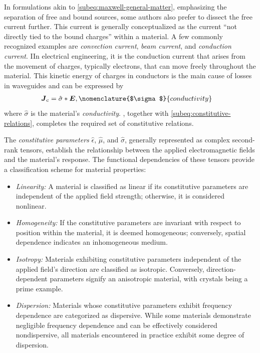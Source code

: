 \documentclass[11pt,a4paper,twoside,openany]{report}
\begin{document}
\begin{remark}
    In formulations akin to \cref{subeq:maxwell-general-matter}, emphasizing the separation of free and bound sources, some authors also prefer to dissect the free current further. This current is generally conceptualized as the current \enquote{not directly tied to the bound charges} within a material. A few commonly recognized examples are \emph{convection current}, \emph{beam current}, and \emph{conduction current}. IIn electrical engineering, it is the conduction current that arises from the movement of charges, typically electrons, that can move freely throughout the material. This kinetic energy of charges in conductors is the main cause of losses in waveguides and can be expressed by
    \begin{align}
        \label{eq:constitutive-relation-conductivity}
        \vec J_{\mathrm c} &= \hat\sigma \ast \vec E,
        \nomenclature{$\sigma$}{conductivity }%
    \end{align}
    where $\hat\sigma$ is the material's \emph{conductivity}. , together with \cref{subeq:constitutive-relations}, completes the required set of constitutive relations.
\end{remark}

The \emph{constitutive parameters} $\hat\epsilon$, $\hat\mu$, and $\hat\sigma$, generally represented as complex second-rank tensors, establish the relationship between the applied electromagnetic fields and the material's response. The functional dependencies of these tensors provide a classification scheme for material properties:
\begin{itemize}
    \item \emph{Linearity:} A material is classified as linear if its constitutive parameters are independent of the applied field strength; otherwise, it is considered nonlinear.
    \item \emph{Homogeneity:} If the constitutive parameters are invariant with respect to position within the material, it is deemed homogeneous; conversely, spatial dependence indicates an inhomogeneous medium.
    \item \emph{Isotropy:} Materials exhibiting constitutive parameters independent of the applied field's direction are classified as isotropic. Conversely, direction-dependent parameters signify an anisotropic material, with crystals being a prime example.
    \item \emph{Dispersion:} Materials whose constitutive parameters exhibit frequency dependence are categorized as dispersive. While some materials demonstrate negligible frequency dependence and can be effectively considered nondispersive, all materials encountered in practice exhibit some degree of dispersion.
\end{itemize}
\end{document}

